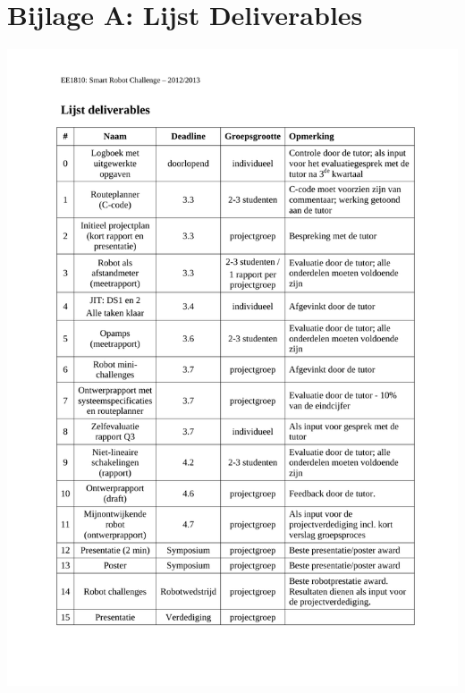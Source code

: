 \documentclass[11pt]{article}
\begin{document}
\section{Bijlage A: Lijst Deliverables}
\includegraphics[scale=0.8]{deliverables-rc.pdf}
\end{document}
